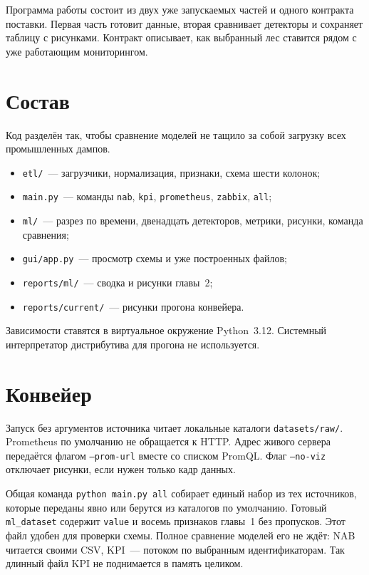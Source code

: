 Программа работы состоит из двух уже запускаемых частей и одного контракта поставки.
Первая часть готовит данные, вторая сравнивает детекторы и сохраняет таблицу с рисунками.
Контракт описывает, как выбранный лес ставится рядом с уже работающим мониторингом.

\section{Состав}

Код разделён так, чтобы сравнение моделей не тащило за собой загрузку всех промышленных дампов.

\begin{itemize}
  \item \texttt{etl/}~--- загрузчики, нормализация, признаки, схема шести колонок;
  \item \texttt{main.py}~--- команды \texttt{nab}, \texttt{kpi}, \texttt{prometheus}, \texttt{zabbix}, \texttt{all};
  \item \texttt{ml/}~--- разрез по времени, двенадцать детекторов, метрики, рисунки, команда сравнения;
  \item \texttt{gui/app.py}~--- просмотр схемы и уже построенных файлов;
  \item \texttt{reports/ml/}~--- сводка и рисунки главы~2;
  \item \texttt{reports/current/}~--- рисунки прогона конвейера.
\end{itemize}

Зависимости ставятся в виртуальное окружение Python~3.12.
Системный интерпретатор дистрибутива для прогона не используется.

\section{Конвейер}

Запуск без аргументов источника читает локальные каталоги \texttt{datasets/raw/}.
Prometheus по умолчанию не обращается к HTTP.
Адрес живого сервера передаётся флагом \texttt{--prom-url} вместе со списком PromQL.
Флаг \texttt{--no-viz} отключает рисунки, если нужен только кадр данных.

Общая команда \texttt{python main.py all} собирает единый набор из тех источников, которые переданы явно или берутся из каталогов по умолчанию.
Готовый \texttt{ml\_dataset} содержит \texttt{value} и восемь признаков главы~1 без пропусков.
Этот файл удобен для проверки схемы.
Полное сравнение моделей его не ждёт: NAB читается своими CSV, KPI~--- потоком по выбранным идентификаторам.
Так длинный файл KPI не поднимается в память целиком.

